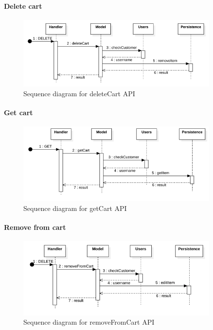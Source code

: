 \paragraph*{Delete cart}
\begin{figure}[H]
    \includegraphics[width=0.9\textwidth]{res/images/sequence-diagrams/carts/deleteCart.png}
    \caption{Sequence diagram for deleteCart API}
\end{figure}

\paragraph*{Get cart}
\begin{figure}[H]
    \includegraphics[width=0.9\textwidth]{res/images/sequence-diagrams/carts/getCart.png}
    \caption{Sequence diagram for getCart API}
\end{figure}

\paragraph*{Remove from cart}
\begin{figure}[H]
    \includegraphics[width=0.9\textwidth]{res/images/sequence-diagrams/carts/removeFromCart.png}
    \caption{Sequence diagram for removeFromCart API}
\end{figure}

